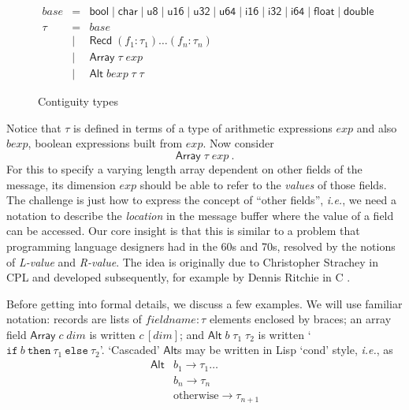 \documentclass[a4paper,UKenglish,cleveref, autoref, thm-restate]{lipics-v2021}
\newcommand{\ie}{\textit{i.e.}}
\newcommand{\konst}[1]{\ensuremath{\mathsf{#1}}}
\newcommand{\itelse}[3]{\mbox{$\mathtt{if}\ {#1}\ \mathtt{then}\ {#2}\ \mathtt{else}\ {#3}$}}
\begin{document}
\begin{figure}
\[
\begin{array}{rcl}
 \mathit{base} & = & \konst{bool} \mid \konst{char} \mid \konst{u8} \mid
 \konst{u16} \mid \konst{u32} \mid \konst{u64}  \mid \konst{i16} \mid
 \konst{i32} \mid \konst{i64} \mid \konst{float} \mid \konst{double} \\
 \tau & = & \mathit{base} \\
      & \mid & \konst{Recd}\; (f_1 : \tau_1) \ldots (f_n : \tau_n) \\
      & \mid & \konst{Array}\; \tau \; \mathit{exp} \\
      & \mid & \konst{Alt}\; \mathit{bexp}\; \tau \; \tau
\end{array}
\]
\caption{Contiguity types}
\label{contig-types}
\end{figure}

Notice that $\tau$ is defined in terms of a type of arithmetic
expressions $\mathit{exp}$ and also $\mathit{bexp}$, boolean
expressions built from $\mathit{exp}$. Now consider
%
\[
 \konst{Array} \; \tau \; \mathit{exp} \ .
\]
%
For this to specify a varying length array dependent on other fields
of the message, its dimension $\mathit{exp}$ should be able to refer
to the \emph{values} of those fields. The challenge is just how to
express the concept of ``other fields'', \ie, we need a notation to
describe the \emph{location} in the message buffer where the value of
a field can be accessed. Our core insight is that this is similar to a
problem that programming language designers had in the 60s and 70s,
resolved by the notions of \emph{L-value} and \emph{R-value}. The idea
is originally due to Christopher Strachey in CPL \cite{strachey} and
developed subsequently, for example by Dennis Ritchie in
C \cite{dmr-lvals}.

Before getting into formal details, we discuss a few examples.  We
will use familiar notation: records are lists of $\mathit{fieldname} :
\tau$ elements enclosed by braces; an array field
$\konst{Array}\;c\;\mathit{dim}$ is written $c\, [\mathit{dim}]$; and
$\konst{Alt}\;b\;\tau_1\;\tau_2$ is written
`$\itelse{b}{\tau_1}{\tau_2}$'. `Cascaded' \konst{Alt}s may be written
in Lisp `cond' style, \ie, as
\[
\begin{array}{ll}
\konst{Alt} & b_1 \longrightarrow \tau_1 \ldots \\
            & b_n \longrightarrow \tau_n \\
            & \text{otherwise} \longrightarrow \tau_{n+1}
\end{array}
\]
\end{document}
